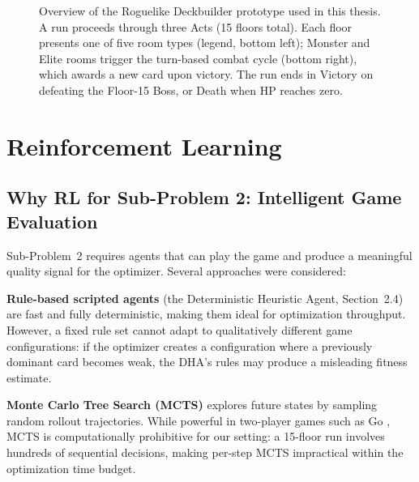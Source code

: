 \begin{figure}[H]
\caption{Overview of the Roguelike Deckbuilder prototype used in this thesis. A run proceeds through three Acts (15 floors total). Each floor presents one of five room types (legend, bottom left); Monster and Elite rooms trigger the turn-based combat cycle (bottom right), which awards a new card upon victory. The run ends in Victory on defeating the Floor-15 Boss, or Death when HP reaches zero.}
\label{fig:game_overview}
\end{figure}

\section{Reinforcement Learning}

\subsection{Why RL for Sub-Problem 2: Intelligent Game Evaluation}

Sub-Problem~2 requires agents that can play the game and produce a meaningful quality signal for the optimizer. Several approaches were considered:

\textbf{Rule-based scripted agents} (the Deterministic Heuristic Agent, Section~2.4) are fast and fully deterministic, making them ideal for optimization throughput. However, a fixed rule set cannot adapt to qualitatively different game configurations: if the optimizer creates a configuration where a previously dominant card becomes weak, the DHA's rules may produce a misleading fitness estimate.

\textbf{Monte Carlo Tree Search (MCTS)} explores future states by sampling random rollout trajectories. While powerful in two-player games such as Go \cite{silver2016mastering}, MCTS is computationally prohibitive for our setting: a 15-floor run involves hundreds of sequential decisions, making per-step MCTS impractical within the optimization time budget.

